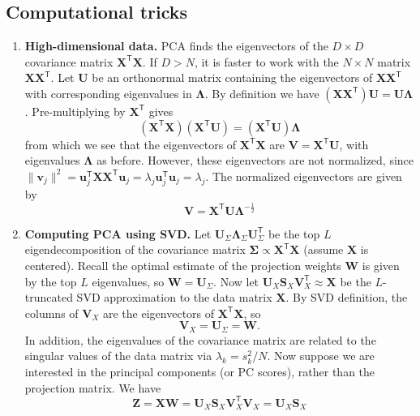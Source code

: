\documentclass[11pt]{article}
\begin{document}
\subsection{Computational tricks}
\begin{enumerate}
    \item \textbf{High-dimensional data.} PCA finds the eigenvectors of the $D \times D$ covariance matrix $\mathbf{X}^\mathsf{T}\mathbf{X}$. If $D > N$, it is faster to work with the $N \times N$ matrix $\mathbf{X}\mathbf{X}^\mathsf{T}$. Let $\mathbf{U}$ be an orthonormal matrix containing the eigenvectors of $\mathbf{X}\mathbf{X}^\mathsf{T}$ with corresponding eigenvalues in $\boldsymbol{\Lambda}$. By definition we have $(\mathbf{X}\mathbf{X}^\mathsf{T})\mathbf{U} = \mathbf{U}\boldsymbol{\Lambda}$. Pre-multiplying by $\mathbf{X}^\mathsf{T}$ gives
    \[
    (\mathbf{X}^\mathsf{T}\mathbf{X})(\mathbf{X}^\mathsf{T}\mathbf{U}) = (\mathbf{X}^\mathsf{T}\mathbf{U})\boldsymbol{\Lambda}
    \]
    from which we see that the eigenvectors of $\mathbf{X}^\mathsf{T}\mathbf{X}$ are $\mathbf{V} = \mathbf{X}^\mathsf{T}\mathbf{U}$, with eigenvalues $\boldsymbol{\Lambda}$ as before. However, these eigenvectors are not normalized, since $\|\boldsymbol{v}_j\|^2 = \boldsymbol{u}_j^\mathsf{T}\mathbf{X}\mathbf{X}^\mathsf{T}\boldsymbol{u}_j = \lambda_j \boldsymbol{u}_j^\mathsf{T}\boldsymbol{u}_j = \lambda_j$. The normalized eigenvectors are given by
    \[
    \mathbf{V} = \mathbf{X}^\mathsf{T}\mathbf{U}\boldsymbol{\Lambda}^{-\frac{1}{2}}
    \]
    \item \textbf{Computing PCA using SVD.} Let $\mathbf{U}_\Sigma \boldsymbol{\Lambda}_\Sigma \mathbf{U}_\Sigma^\mathsf{T}$ be the top $L$ eigendecomposition of the covariance matrix $\boldsymbol{\Sigma} \propto \mathbf{X}^\mathsf{T}\mathbf{X}$ (assume $\mathbf{X}$ is centered). Recall the optimal estimate of the projection weights $\mathbf{W}$ is given by the top $L$ eigenvalues, so $\mathbf{W} = \mathbf{U}_\Sigma$. Now let $\mathbf{U}_X \mathbf{S}_X \mathbf{V}_X^\mathsf{T} \approx \mathbf{X}$ be the $L$-truncated SVD approximation to the data matrix $\mathbf{X}$. By SVD definition, the columns of $\mathbf{V}_X$ are the eigenvectors of $\mathbf{X}^\mathsf{T}\mathbf{X}$, so 
    \[
    \mathbf{V}_X = \mathbf{U}_\Sigma = \mathbf{W}.
    \]
    In addition, the eigenvalues of the covariance matrix are related to the singular values of the data matrix via $\lambda_k = s_k^2/N$. Now suppose we are interested in the principal components (or PC scores), rather than the projection matrix. We have
    \[
    \mathbf{Z} = \mathbf{X}\mathbf{W} = \mathbf{U}_X \mathbf{S}_X \mathbf{V}_X^\mathsf{T} \mathbf{V}_X = \mathbf{U}_X \mathbf{S}_X
\]
\end{enumerate}
\end{document}
